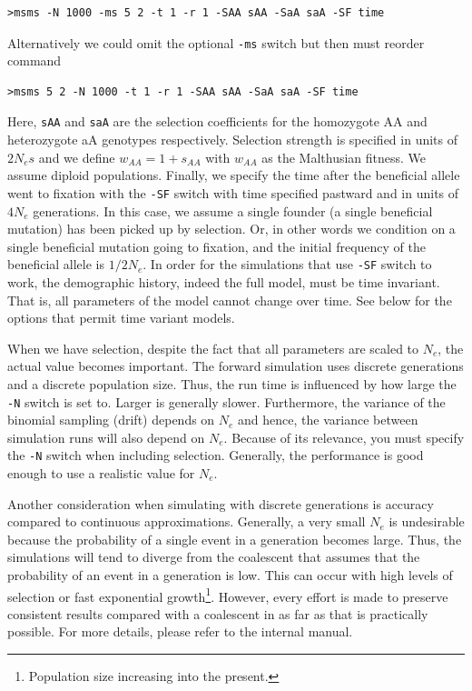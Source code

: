 \documentclass{article}
\begin{document}
\begin{verbatim}
>msms -N 1000 -ms 5 2 -t 1 -r 1 -SAA sAA -SaA saA -SF time
\end{verbatim}

Alternatively we could omit the optional {\tt -ms} switch but then must reorder
command

\begin{verbatim}
>msms 5 2 -N 1000 -t 1 -r 1 -SAA sAA -SaA saA -SF time
\end{verbatim}

Here, {\tt sAA} and {\tt saA} are the selection coefficients for the
homozygote AA and heterozygote aA genotypes respectively. Selection strength is specified in
units of $2N_es$ and we define $w_{AA}=1+s_{AA}$ with $w_{AA}$ as the Malthusian
fitness. We assume diploid populations. Finally, we specify the time after the
beneficial allele went to fixation with the {\tt -SF}  switch with time
specified pastward and in units of $4N_e$ generations. In this  case, we assume a single
founder (a single beneficial mutation) has been picked up by selection. Or, in
other words we condition on a single beneficial mutation going  to fixation, and the initial
frequency of the beneficial allele is $1/2N_e$. In order for the simulations that
use {\tt -SF} switch to work, the demographic history, indeed the full model,
must be time invariant. That is,  all parameters of the model cannot change over
time. See below for the options that  permit time variant models.

When we have selection, despite the fact that all parameters are scaled to $N_e$,
the actual value becomes important. The forward simulation uses discrete
generations and a discrete population size. Thus, the run time is influenced by
how large the {\tt -N} switch is set to. Larger is generally slower. Furthermore,
the variance of the binomial sampling (drift) depends on $N_e$ and hence, the
variance between simulation runs will also depend on $N_e$. Because of its
relevance, you must specify the {\tt -N} switch when including
selection. Generally, the performance is good enough to use a realistic value for $N_e$.

Another consideration when simulating with discrete generations is accuracy
compared to continuous approximations. Generally, a very small $N_e$ is
undesirable because the probability of a single event in a generation becomes
large. Thus, the simulations will tend to diverge from the coalescent that
assumes that the probability of an event in a generation is low. This can occur
with high levels of selection or fast exponential growth\footnote{Population size
increasing into the present.}. However, every effort is made to preserve
consistent results compared with a coalescent in as far as that is practically
possible. For more details, please refer to the internal manual.
\end{document}
